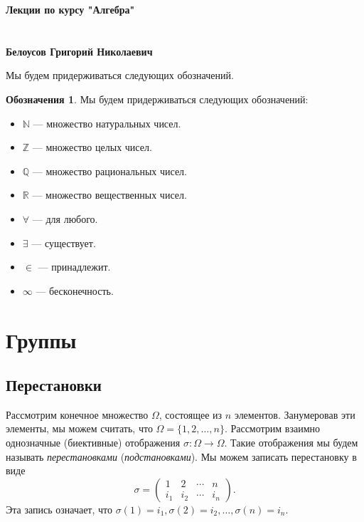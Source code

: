 \documentclass[12pt, titlepage, oneside]{amsbook}
\date{}
\newcommand{\NN}{\mathbb{N}}
\newcommand{\ZZ}{\mathbb{Z}}
\newcommand{\RR}{\mathbb{R}}
\newcommand{\QQ}{\mathbb{Q}}
\theoremstyle{definition}
\newtheorem{notation}[theorem]{Обозначения}
\theoremstyle{remark}
\begin{document}
\begin{titlepage}
	\begin{center}
		\large{\textbf{Лекции по курсу "Алгебра"}} \quad \\
		\quad
		\\ \quad
		\\ \quad
		\large{\textbf{Белоусов Григорий Николаевич}} \quad \\ \quad
		
	\end{center}
\end{titlepage}

\tableofcontents

Мы будем придерживаться следующих обозначений.

\begin{notation}
	\label{not}  Мы будем придерживаться следующих обозначений:
	\begin{itemize}
		\item $\NN$ --- множество натуральных чисел.
		\item $\ZZ$ --- множество целых чисел.
		\item $\QQ$ --- множество рациональных чисел.
		\item $\RR$ --- множество вещественных чисел.
		\item $\forall$ --- для любого.
		\item $\exists$ --- существует.
		\item $\in$ --- принадлежит.
		\item $\infty$ --- бесконечность.
	\end{itemize}
\end{notation}

\chapter{Группы}

\section{Перестановки}

Рассмотрим конечное множество $\Omega$, состоящее из $n$ элементов. Занумеровав эти элементы, мы можем считать, что $\Omega=\{1,2,\ldots,n\}$. Рассмотрим взаимно однозначные (биективные) отображения $\sigma\colon\Omega\rightarrow\Omega$. Такие отображения мы будем называть \emph{перестановками} (\emph{подстановками}). Мы можем записать перестановку в виде $$\sigma=\begin{pmatrix} 1   & 2   & \cdots & n   \\
                i_1 & i_2 & \cdots & i_n\end{pmatrix}.$$ Эта запись означает, что $\sigma(1)=i_1,\sigma(2)=i_2,\ldots,\sigma(n)=i_n$.
\end{document}
